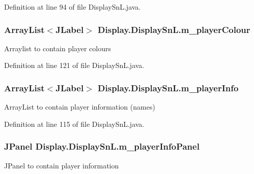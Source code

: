 Definition at line 94 of file Display\+Sn\+L.\+java.

\hypertarget{class_display_1_1_display_sn_l_a075a16b363ea3d1e75e589fe11b2b0e7}{}
\subsubsection[{m\+\_\+player\+Colour}]{\setlength{\rightskip}{0pt plus 5cm}Array\+List$<$J\+Label$>$ Display.\+Display\+Sn\+L.\+m\+\_\+player\+Colour\hspace{0.3cm}{\ttfamily [private]}}\label{class_display_1_1_display_sn_l_a075a16b363ea3d1e75e589fe11b2b0e7}
Arraylist to contain player colours 

Definition at line 121 of file Display\+Sn\+L.\+java.

\hypertarget{class_display_1_1_display_sn_l_ad4d75120b08606844b7fa63e2990928b}{}
\subsubsection[{m\+\_\+player\+Info}]{\setlength{\rightskip}{0pt plus 5cm}Array\+List$<$J\+Label$>$ Display.\+Display\+Sn\+L.\+m\+\_\+player\+Info\hspace{0.3cm}{\ttfamily [private]}}\label{class_display_1_1_display_sn_l_ad4d75120b08606844b7fa63e2990928b}
Array\+List to contain player information (names) 

Definition at line 115 of file Display\+Sn\+L.\+java.

\hypertarget{class_display_1_1_display_sn_l_a7afa5f7ca8e697b64de4de4246f2c2a8}{}
\subsubsection[{m\+\_\+player\+Info\+Panel}]{\setlength{\rightskip}{0pt plus 5cm}J\+Panel Display.\+Display\+Sn\+L.\+m\+\_\+player\+Info\+Panel\hspace{0.3cm}{\ttfamily [private]}}\label{class_display_1_1_display_sn_l_a7afa5f7ca8e697b64de4de4246f2c2a8}
J\+Panel to contain player information 


